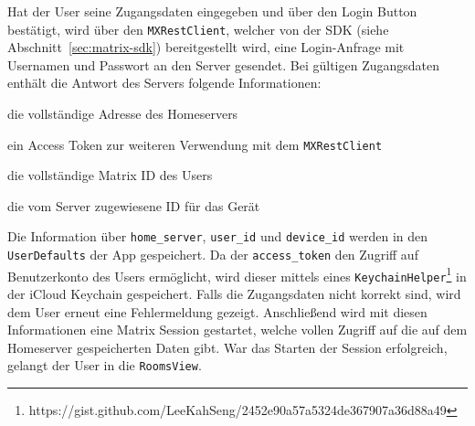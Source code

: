     Hat der User seine Zugangsdaten eingegeben und über den Login Button bestätigt, wird über den \texttt{MXRestClient}, welcher von der SDK (siehe Abschnitt~\ref{sec:matrix-sdk}) bereitgestellt wird, eine Login-Anfrage mit Usernamen und Passwort an den Server gesendet.
    Bei gültigen Zugangsdaten enthält die Antwort des Servers folgende Informationen:
    \begin{description}[leftmargin=!,labelwidth=3cm]
        \item [home\_server] die vollständige Adresse des Homeservers
        \item [access\_token] ein Access Token zur weiteren Verwendung mit dem \texttt{MXRestClient}
        \item [user\_id] die vollständige Matrix ID des Users
        \item [device\_id] die vom Server zugewiesene ID für das Gerät
    \end{description}
    Die Information über \texttt{home\_server}, \texttt{user\_id} und \texttt{device\_id} werden in den \texttt{UserDefaults} der App gespeichert.
    Da der \texttt{access\_token} den Zugriff auf Benutzerkonto des Users ermöglicht, wird dieser mittels eines \texttt{KeychainHelper}\footnote{https://gist.github.com/LeeKahSeng/2452e90a57a5324de367907a36d88a49} in der iCloud Keychain gespeichert.
    Falls die Zugangsdaten nicht korrekt sind, wird dem User erneut eine Fehlermeldung gezeigt.
    Anschließend wird mit diesen Informationen eine Matrix Session gestartet, welche vollen Zugriff auf die auf dem Homeserver gespeicherten Daten gibt.
    War das Starten der Session erfolgreich, gelangt der User in die \texttt{RoomsView}.\\

